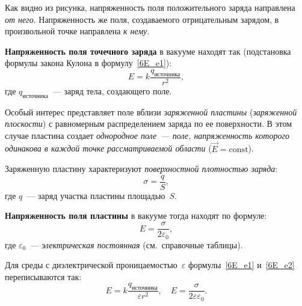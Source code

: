\documentclass[main.tex]{subfiles}
\begin{document}
Как видно из рисунка, напряженность поля положительного заряда направлена \emph{от него}. 
Напряженность же поля, создаваемого отрицательным зарядом, в произвольной точке направлена \emph{к нему}.

\textbf{Напряженность поля точечного заряда} в вакууме находят так (подстановка формулы закона Кулона в формулу~\eqref{6E_e1}):
\begin{equation}
    \label{e28}
    E=k\frac{q_\text{источника}}{r^2},
\end{equation}
где $q_\text{источника}$~--- заряд тела, создающего поле.

Особый интерес представляет поле вблизи \emph{заряженной пластины} (\emph{заряженной плоскости}) с равномерным распределением заряда по ее поверхности. В этом случае пластина создает \emph{однородное поле~--- поле, напряженность которого одинакова в каждой точке рассматриваемой области} ($\vec E=\mathrm{const}$).

Заряженную пластину характеризуют \emph{поверхностной плотностью заряда}:
\begin{equation}
    \sigma=\frac{q}{S},
\end{equation}
где $q$~--- заряд участка пластины площадью~$S$.

\textbf{Напряженность поля пластины} в вакууме тогда находят по формуле:
\begin{equation}
    \label{6E_e2}
    E=\frac{\sigma}{2\varepsilon_0},
\end{equation}
где $\varepsilon_0$~--- \emph{электрическая постоянная} (см.~справочные таблицы).

Для среды с диэлектрической проницаемостью~$\varepsilon$ формулы~\eqref{6E_e1} и~\eqref{6E_e2} переписываются так:
\begin{equation*}
    E=k\frac{q_\text{источника}}{\varepsilon r^2},\quad E=\frac{\sigma}{2\varepsilon\varepsilon_0}. 
\end{equation*}













 
\end{document}
